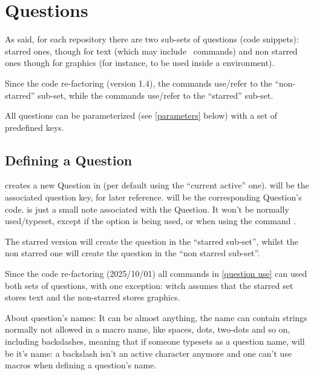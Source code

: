 \documentclass[10pt]{article}
\begin{document}
\section{Questions}
As said, for each repository there are two sub-sets of questions (code snippets): starred ones, though for text (which may include \LaTeXe\ commands) and non starred ones though for graphics (for instance, to be used inside a  environment). 

Since the code re-factoring (version 1.4), the commands  use/refer to the ``non-starred'' sub-set, while the commands  use/refer to the ``starred'' sub-set.

 All questions can be parameterized (see \ref{parameters} below) with a set of predefined keys.

\subsection{Defining a Question}\label{question definition}
\begin{codedescribe}{}
\begin{codesyntax}%
\end{codesyntax}
 creates a new Question in  (per default using the ``current active'' one).  will be the associated question key, for later reference.  will be the corresponding Question's code.  is just a small note associated with the Question. It won't be normally used/typeset, except if the  option is being used, or when using the command \tsobj{\QuestionsList}.

The starred version  will create the question in the ``starred sub-set'', whilst the non starred one  will create the question in the ``non starred sub-set''. 
\end{codedescribe}
\begin{tsremark}
  Since the code re-factoring (2025/10/01) all commands in \ref{question use} can used both sets of questions, with one exception: \tsobj{\QuestionsList} witch assumes that the starred set stores text and the non-starred stores  graphics.
\end{tsremark}
\begin{tsremark}
About question's names: It can be almost anything, the name can contain strings normally not allowed in a macro name, like spaces, dots, two-dots and so on, including backslashes, meaning that if someone typesets \tsobj{\XYZ} as a question name, \tsobj{\XYZ} will be it's name: a backslash isn't an active character anymore and one can't use macros when defining a question's name.
\end{tsremark}
\end{document}
